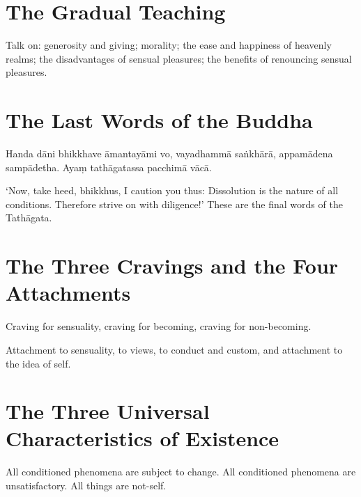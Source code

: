 \section*{The Gradual Teaching}

Talk on: generosity and giving; morality; the ease and happiness of heavenly
realms; the disadvantages of sensual pleasures; the benefits of renouncing
sensual pleasures.


\ifhandbookedition
\vspace*{-\baselineskip}
\fi

\section*{The Last Words of the Buddha}

Handa dāni bhikkhave āmantayāmi vo, vayadhammā saṅkhārā, appamādena sampādetha.
Ayaṃ tathāgatassa pacchimā vācā.

‘Now, take heed, bhikkhus, I caution you thus: Dissolution is the
nature of all conditions. Therefore strive on with diligence!’ These are the final words of the Tathāgata.


\ifhandbookedition
\vspace*{-\baselineskip}
\fi

\section*{The Three Cravings and the Four Attachments}

Craving for sensuality, craving for becoming, craving for non-becoming.

Attachment to sensuality, to views, to conduct and custom, and attachment to the
idea of self.


\ifhandbookedition
\vspace*{-\baselineskip}
\fi

\section*{The Three Universal Characteristics of Existence}

All conditioned phenomena are subject to change.
All conditioned phenomena are unsatisfactory.
All things are not-self.


